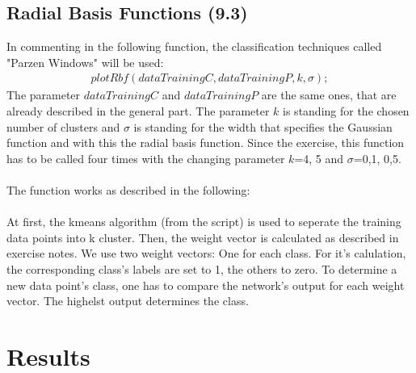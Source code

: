 \documentclass[a4paper,headings=small]{scrartcl}
\begin{document}
\subsection{Radial Basis Functions (9.3)}
In commenting in the following function, the classification techniques called "Parzen Windows" will be used:\\
\begin{align}
plotRbf(dataTrainingC, dataTrainingP, k, \sigma);
\end{align}
The parameter $dataTrainingC$ and $dataTrainingP$ are the same ones, that are already described in the general part. The parameter $k$ is standing for the chosen number of clusters and $\sigma$ is standing for the width that specifies the Gaussian function and with this the radial basis function.
Since the exercise, this function has to be called four times with the changing parameter $k$=4, 5 and $\sigma$=0,1, 0,5.\\
\\
The function works as described in the following:\\
\\
At first, the kmeans algorithm (from the script) is used to seperate the training data points into k cluster. Then, the weight vector is calculated as described in exercise notes. We use two weight vectors: One for each class. For it's calulation, the corresponding class's labels are set to 1, the others to zero. To determine a new data point's class, one has to compare the network's output for each weight vector. The highelst output determines the class.

\section{Results}
\end{document}
